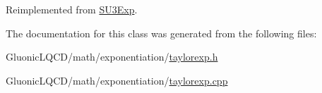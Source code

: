 Reimplemented from \mbox{\hyperlink{class_s_u3_exp_a9760c17b9c3a4b6d0a5cd4d88c6d577e}{S\+U3\+Exp}}.



The documentation for this class was generated from the following files\+:\begin{DoxyCompactItemize}
\item 
Gluonic\+L\+Q\+C\+D/math/exponentiation/\mbox{\hyperlink{taylorexp_8h}{taylorexp.\+h}}\item 
Gluonic\+L\+Q\+C\+D/math/exponentiation/\mbox{\hyperlink{taylorexp_8cpp}{taylorexp.\+cpp}}\end{DoxyCompactItemize}
